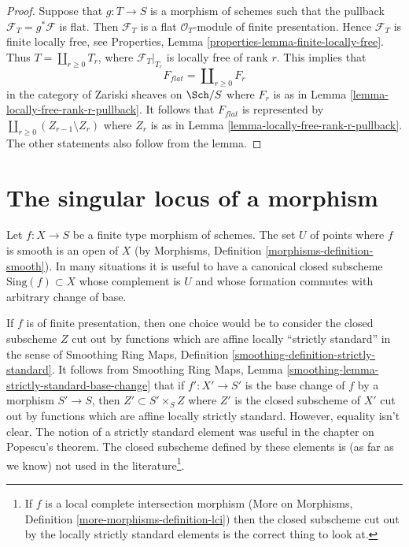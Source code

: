 \begin{proof}
Suppose that $g : T \to S$ is a morphism of schemes such that the pullback
$\mathcal{F}_T = g^*\mathcal{F}$ is flat. Then $\mathcal{F}_T$ is a flat
$\mathcal{O}_T$-module of finite presentation. Hence
$\mathcal{F}_T$ is finite locally free, see
Properties, Lemma \ref{properties-lemma-finite-locally-free}.
Thus $T = \coprod_{r \geq 0} T_r$, where $\mathcal{F}_T|_{T_r}$ is locally
free of rank $r$. This implies that
$$
F_{flat} = \coprod\nolimits_{r \geq 0} F_r
$$
in the category of Zariski sheaves on $\Sch/S$ where $F_r$ is as in
Lemma \ref{lemma-locally-free-rank-r-pullback}. It follows
that $F_{flat}$ is represented by
$\coprod_{r \geq 0} (Z_{r - 1} \setminus Z_r)$ where
$Z_r$ is as in
Lemma \ref{lemma-locally-free-rank-r-pullback}.
The other statements also follow from the lemma.
\end{proof}






\section{The singular locus of a morphism}
\label{section-singular-locus-morphism}

\noindent
Let $f : X \to S$ be a finite type morphism of schemes. The set $U$ of points
where $f$ is smooth is an open of $X$
(by Morphisms, Definition \ref{morphisms-definition-smooth}).
In many situations it is useful to have a canonical closed
subscheme $\text{Sing}(f) \subset X$ whose complement is $U$
and whose formation commutes with arbitrary change of base.

\medskip\noindent
If $f$ is of finite presentation, then one choice would be to consider the
closed subscheme $Z$ cut out by functions which are affine locally
``strictly standard'' in the sense of
Smoothing Ring Maps, Definition \ref{smoothing-definition-strictly-standard}.
It follows from
Smoothing Ring Maps, Lemma \ref{smoothing-lemma-strictly-standard-base-change}
that if $f' : X' \to S'$ is the base change of $f$ by a morphism
$S' \to S$, then $Z' \subset S' \times_S Z$ where $Z'$ is the
closed subscheme of $X'$ cut out by functions which are affine
locally strictly standard. However, equality isn't clear.
The notion of a strictly standard element was useful in the chapter on
Popescu's theorem. The closed subscheme defined by these elements is
(as far as we know) not used in the literature\footnote{If $f$ is a
local complete intersection morphism
(More on Morphisms, Definition \ref{more-morphisms-definition-lci})
then the closed subscheme cut out by the locally strictly standard
elements is the correct thing to look at.}.

